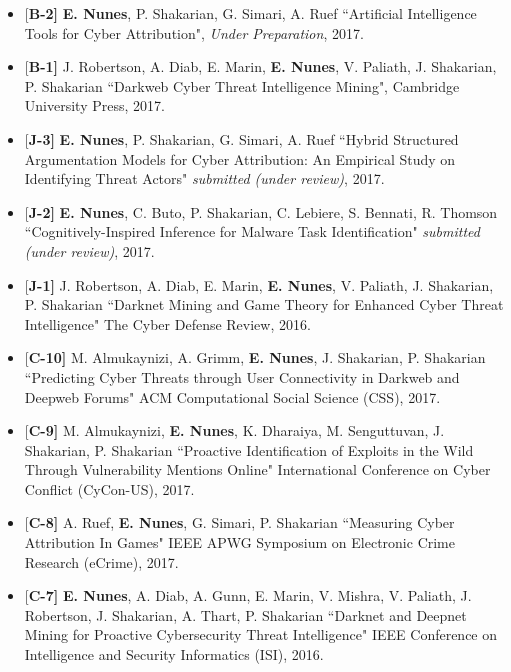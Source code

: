 \documentclass[margin,line]{CV}
\begin{document}
\begin{resume}
\begin{itemize}[leftmargin =*]

\item {[\bf B-2]}  {\bf E. Nunes}, P. Shakarian, G. Simari, A. Ruef ``Artificial Intelligence Tools for Cyber Attribution", {\em Under Preparation}, 2017. 

\item {[\bf B-1]} J. Robertson, A. Diab, E. Marin, {\bf E. Nunes}, V. Paliath, J. Shakarian, P. Shakarian ``Darkweb Cyber Threat Intelligence Mining", Cambridge University Press, 2017. 

\item {[\bf J-3]} {\bf E. Nunes}, P. Shakarian, G. Simari, A. Ruef ``Hybrid Structured Argumentation Models for Cyber Attribution: An Empirical Study on Identifying Threat Actors" {\em submitted (under review)}, 2017.

\item {[\bf J-2]} {\bf E. Nunes}, C. Buto, P. Shakarian, C. Lebiere, S. Bennati, R. Thomson ``Cognitively-Inspired Inference for Malware Task Identification" {\em submitted (under review)}, 2017.

\item {[\bf J-1]} J. Robertson, A. Diab, E. Marin, {\bf E. Nunes}, V. Paliath, J. Shakarian, P. Shakarian ``Darknet Mining and Game Theory for Enhanced Cyber Threat Intelligence" The Cyber Defense Review, 2016.

\item {[\bf C-10]} M. Almukaynizi, A. Grimm, {\bf E. Nunes}, J. Shakarian, P. Shakarian  ``Predicting Cyber Threats through User Connectivity in Darkweb and Deepweb Forums" ACM Computational Social Science (CSS), 2017.

\item {[\bf C-9]} M. Almukaynizi, {\bf E. Nunes}, K. Dharaiya, M. Senguttuvan, J. Shakarian, P. Shakarian  ``Proactive Identification of Exploits in the Wild Through Vulnerability Mentions Online" International Conference on Cyber Conflict (CyCon-US), 2017.


\item {[\bf C-8]} A. Ruef, {\bf E. Nunes}, G. Simari, P. Shakarian  ``Measuring Cyber Attribution In Games" IEEE APWG Symposium on Electronic Crime Research (eCrime), 2017.


\item {[\bf C-7]} {\bf E. Nunes}, A. Diab, A. Gunn, E. Marin, V. Mishra, V. Paliath, J. Robertson, J. Shakarian, A. Thart, P. Shakarian ``Darknet and Deepnet Mining for Proactive Cybersecurity Threat Intelligence" IEEE Conference on Intelligence and Security Informatics (ISI), 2016.


\end{itemize}
\end{resume}
\end{document}
